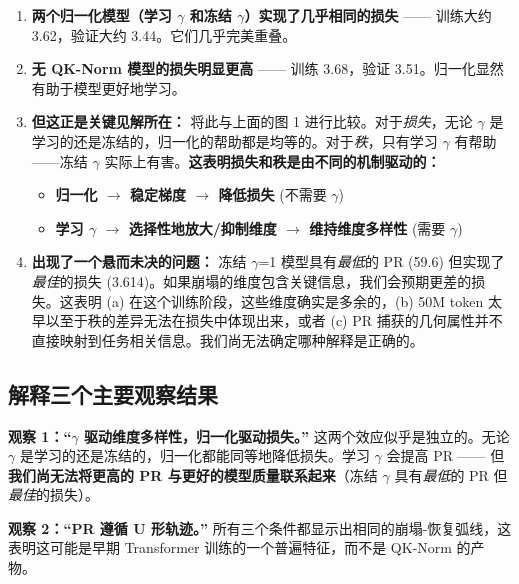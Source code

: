 \documentclass[11pt]{ctexart}
\begin{document}
\begin{enumerate}
\item \textbf{两个归一化模型（学习 $\gamma$ 和冻结 $\gamma$）实现了几乎相同的损失} —— 训练大约 3.62，验证大约 3.44。它们几乎完美重叠。

\item \textbf{无 QK-Norm 模型的损失明显更高} —— 训练 3.68，验证 3.51。归一化显然有助于模型更好地学习。

\item \textbf{但这正是关键见解所在：} 将此与上面的图 1 进行比较。对于\textit{损失}，无论 $\gamma$ 是学习的还是冻结的，归一化的帮助都是均等的。对于\textit{秩}，只有学习 $\gamma$ 有帮助——冻结 $\gamma$ 实际上有害。\textbf{这表明损失和秩是由不同的机制驱动的：}
\begin{itemize}
\item \textbf{归一化 $\rightarrow$ 稳定梯度 $\rightarrow$ 降低损失} (不需要 $\gamma$)
\item \textbf{学习 $\gamma$ $\rightarrow$ 选择性地放大/抑制维度 $\rightarrow$ 维持维度多样性} (需要 $\gamma$)
\end{itemize}

\item \textbf{出现了一个悬而未决的问题：} 冻结 $\gamma$=1 模型具有\textit{最低}的 PR (59.6) 但实现了\textit{最佳}的损失 (3.614)。如果崩塌的维度包含关键信息，我们会预期更差的损失。这表明 (a) 在这个训练阶段，这些维度确实是多余的，(b) 50M token 太早以至于秩的差异无法在损失中体现出来，或者 (c) PR 捕获的几何属性并不直接映射到任务相关信息。我们尚无法确定哪种解释是正确的。
\end{enumerate}

\subsection{解释三个主要观察结果}

\begin{tcolorbox}[colback=gray!10, colframe=gray!50, arc=2mm, boxrule=0.5pt]
\textbf{观察 1：“$\gamma$ 驱动维度多样性，归一化驱动损失。”} 这两个效应似乎是独立的。无论 $\gamma$ 是学习的还是冻结的，归一化都能同等地降低损失。学习 $\gamma$ 会提高 PR —— 但\textbf{我们尚无法将更高的 PR 与更好的模型质量联系起来}（冻结 $\gamma$ 具有\textit{最低}的 PR 但\textit{最佳}的损失）。
\end{tcolorbox}

\begin{tcolorbox}[colback=gray!10, colframe=gray!50, arc=2mm, boxrule=0.5pt]
\textbf{观察 2：“PR 遵循 U 形轨迹。”} 所有三个条件都显示出相同的崩塌-恢复弧线，这表明这可能是早期 Transformer 训练的一个普遍特征，而不是 QK-Norm 的产物。
\end{tcolorbox}
\end{document}
